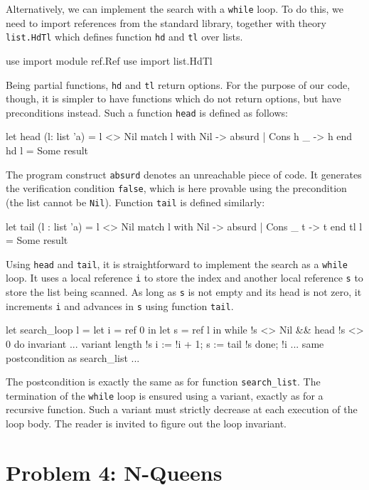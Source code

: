 Alternatively, we can implement the search with a \texttt{while} loop.
To do this, we need to import references from the standard library,
together with theory \texttt{list.HdTl} which defines function
\texttt{hd} and \texttt{tl} over lists.
\begin{whycode}
  use import module ref.Ref
  use import list.HdTl
\end{whycode}
Being partial functions, \texttt{hd} and \texttt{tl} return options.
For the purpose of our code, though, it is simpler to have functions
which do not return options, but have preconditions instead. Such a
function \texttt{head} is defined as follows:
\begin{whycode}
  let head (l: list 'a) =
    { l <> Nil }
    match l with Nil -> absurd | Cons h _ -> h end
    { hd l = Some result }
\end{whycode}
The program construct \texttt{absurd} denotes an unreachable piece of
code. It generates the verification condition \texttt{false}, which is
here provable using the precondition (the list cannot be \texttt{Nil}).
Function \texttt{tail} is defined similarly:
\begin{whycode}
  let tail (l : list 'a) =
    { l <> Nil }
    match l with Nil -> absurd | Cons _ t -> t end
    { tl l = Some result }
\end{whycode}
Using \texttt{head} and \texttt{tail}, it is straightforward to
implement the search as a \texttt{while} loop.
It uses a local reference \texttt{i} to store the index and another
local reference \texttt{s} to store the list being scanned.
As long as \texttt{s} is not empty and its head is not zero, it
increments \texttt{i} and advances in \texttt{s} using function \texttt{tail}.
\begin{whycode}
  let search_loop l =
    { }
    let i = ref 0 in
    let s = ref l in
    while !s <> Nil && head !s <> 0 do
      invariant { ... }
      variant   { length !s }
      i := !i + 1;
      s := tail !s
    done;
    !i
    { ... same postcondition as search_list ... }
\end{whycode}
The postcondition is exactly the same as for function \verb|search_list|.
The termination of the \texttt{while} loop is ensured using a variant,
exactly as for a recursive function. Such a variant must strictly decrease at
each execution of the loop body. The reader is invited to figure out
the loop invariant.

\section{Problem 4: N-Queens}


